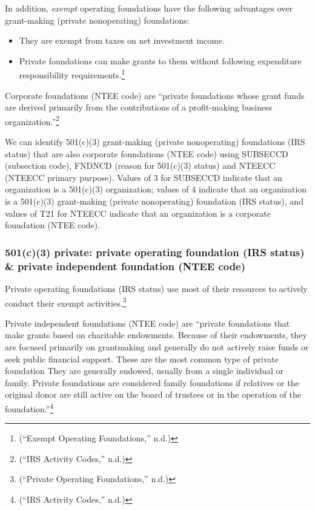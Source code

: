\documentclass[
  letterpaper,
  DIV=11,
  numbers=noendperiod,
  oneside]{scrreprt}
\providecommand{\tightlist}{%
  \setlength{\itemsep}{0pt}\setlength{\parskip}{0pt}}\usepackage{longtable,booktabs,array}
\begin{document}
In addition, \emph{exempt} operating foundations have the following
advantages over grant-making (private nonoperating) foundations:

\begin{itemize}
\tightlist
\item
  They are exempt from taxes on net investment income.
\item
  Private foundations can make grants to them without following
  expenditure responsibility requirements.\footnote{({``Exempt Operating
    Foundations,''} n.d.)}
\end{itemize}

Corporate foundations (NTEE code) are ``private foundations whose grant
funds are derived primarily from the contributions of a profit-making
business organization.''\footnote{({``IRS Activity Codes,''} n.d.)}

We can identify 501(c)(3) grant-making (private nonoperating)
foundations (IRS status) that are also corporate foundations (NTEE code)
using SUBSECCD (subsection code), FNDNCD (reason for 501(c)(3) status)
and NTEECC (NTEECC primary purpose). Values of 3 for SUBSECCD indicate
that an organization is a 501(c)(3) organization; values of 4 indicate
that an organization is a 501(c)(3) grant-making (private nonoperating)
foundation (IRS status), and values of T21 for NTEECC indicate that an
organization is a corporate foundation (NTEE code).

\hypertarget{c3-private-private-operating-foundation-irs-status-private-independent-foundation-ntee-code}{%
\subsubsection{501(c)(3) private: private operating foundation (IRS
status) \& private independent foundation (NTEE
code)}\label{c3-private-private-operating-foundation-irs-status-private-independent-foundation-ntee-code}}

Private operating foundations (IRS status) use most of their resources
to actively conduct their exempt activities.\footnote{({``Private
  Operating Foundations,''} n.d.)}

Private independent foundations (NTEE code) are ``private foundations
that make grants based on charitable endowments. Because of their
endowments, they are focused primarily on grantmaking and generally do
not actively raise funds or seek public financial support. These are the
most common type of private foundation They are generally endowed,
usually from a single individual or family. Private foundations are
considered family foundations if relatives or the original donor are
still active on the board of trustees or in the operation of the
foundation.''\footnote{({``IRS Activity Codes,''} n.d.)}
\end{document}
